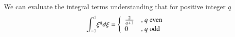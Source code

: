 We can evaluate the integral terms understanding that for positive integer $q$
\begin{equation}
{\int^1_{-1}} \xi^q d\xi = 
\left\{
\begin{array}{ll}
\frac{2}{q+1} & \mbox{, $q$ even}\\
0 & \mbox{, $q$ odd} 
\end{array}
\right.
\end{equation}

\begin{comment}
\begin{align}
 \ioo& \l\{ \gL\xi + \frac{c_1}{J_n^2} \ddxi{\gL}(j-1)\r\}\xi^{j-2} d \xi =0 \mbox{ for }
j=1,\ldots,m\\
 \implies &\sum^s_{k=0}\theta_{ik} \ioo \l\{ \xi^{k+1} + \frac{c_1}{J_n^2} k
\xi^{k-1}(j-1)\r\}\xi^{j-2}d\xi =0
\end{align}

We want to evaluate
\begin{equation}
 \ioo \l\{ \underbrace{\xi^{k+j-1}}_{\text{\ding{172}}} + \underbrace{\frac{c_1}{J_n^2} k (j-1)
\xi^{k+j-3}}_{\text{\ding{173}}} \r\} d\xi \mbox{ , } 0\le k\le s
\end{equation}

\ding{172}:

\begin{equation}
\ioo \xi^{k+j-1} d\xi = \frac{1}{k+j} \xi^{k+j} \bigg|^1_{-1} = \frac{1}{k+j} \l[ 1-(-1)^{k+j} \r]
\end{equation}

\ding{173}:
\begin{equation}
 \frac{1}{J_n^2}\ioo c_1 k (j-1) \xi^{k+j-3} d\xi = \frac{c_1}{J_n^2} k (j-1) \frac{1}{k+j-2} \l[
1-(-1)^{k+j-2} \r] \mbox{ for
} k+j\ne2
\end{equation}
If $k+j=2$, $j=2$ and $k=0$, so
\begin{equation}
 \ioo c_1 k (j-1) \xi^{k+j-3} d\xi = 0
\end{equation}

To find the coefficients of the monomials that describe $\gL$ and $\gR$, we want to write the
constraints in matrix form:
\begin{equation}
\label{eq:gcoeff}
 0=\sum^s_{k=0} \theta_{ik} \l\{  \frac{1}{k+j} \l[1-(-1)^{k+j}\r] + \frac{c_1}{J_n^2} k
\frac{j-1}{k+j-2} \l[
1-(-1)^{k+j-2} \r] \r\} \mbox{  for  } j=1,\ldots,p
\end{equation}

Note that for $j$ odd, Eqn.~\ref{eq:gcoeff} becomes
\begin{equation}
 0 = \sum^s_{\substack{k=0\\k \text{ even}}} \theta_{ik} \l\{ \frac{2}{k+j} +2 \frac{c_1}{J_n^2} k
\frac{j-1}{k+j-2}\r\}
\end{equation}

and for $j$ even, Eqn.~\ref{eq:gcoeff} becomes
\begin{equation}
 0 = \sum^s_{\substack{k=0\\k \text{ odd}}} \theta_k \l\{ \frac{2}{k+j} +2 \frac{c_1}{J_n^2} k
\frac{j-1}{k+j-2}\r\}
\end{equation}
\end{comment}
